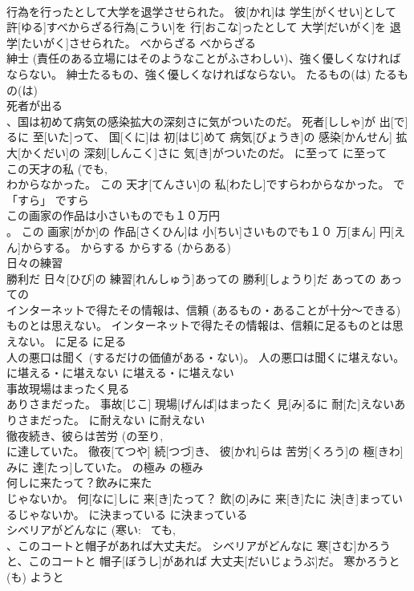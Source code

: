 \documentclass[8pt]{extreport}
\begin{document}
\begin{CJK}{UTF8}{min}
\\	行為を行ったとして大学を退学させられた。	彼[かれ]は 学生[がくせい]として 許[ゆる]すべからざる行為[こうい]を 行[おこな]ったとして 大学[だいがく]を 退学[たいがく]させられた。	べからざる	べからざる	
\\	紳士 (責任のある立場にはそのようなことがふさわしい)、強く優しくなければならない。	紳士たるもの、強く優しくなければならない。	たるもの(は)	たるもの(は)	
\\	死者が出る 
\\	、国は初めて病気の感染拡大の深刻さに気がついたのだ。	死者[ししゃ]が 出[で]るに 至[いた]って、 国[くに]は 初[はじ]めて 病気[びょうき]の 感染[かんせん] 拡大[かくだい]の 深刻[しんこく]さに 気[き]がついたのだ。	に至って	に至って	
\\	この天才の私 (でも, 
\\	わからなかった。	この 天才[てんさい]の 私[わたし]ですらわからなかった。	で「すら」	ですら	
\\	この画家の作品は小さいものでも１０万円 
\\	。	この 画家[がか]の 作品[さくひん]は 小[ちい]さいものでも１０ 万[まん] 円[えん]からする。	からする	からする (からある)	
\\	日々の練習 
\\	勝利だ	日々[ひび]の 練習[れんしゅう]あっての 勝利[しょうり]だ	あっての	あっての	
\\	インターネットで得たその情報は、信頼 (あるもの・あることが十分～できる)ものとは思えない。	インターネットで得たその情報は、信頼に足るものとは思えない。	に足る	に足る	
\\	人の悪口は聞く (するだけの価値がある・ない)。	人の悪口は聞くに堪えない。	に堪える・に堪えない	に堪える・に堪えない	
\\	事故現場はまったく見る 
\\	ありさまだった。	事故[じこ] 現場[げんば]はまったく 見[み]るに 耐[た]えないありさまだった。	に耐えない	に耐えない	
\\	徹夜続き、彼らは苦労 (の至り, 
\\	に達していた。	徹夜[てつや] 続[つづ]き、 彼[かれ]らは 苦労[くろう]の 極[きわ]みに 達[たっ]していた。	の極み	の極み	
\\	何しに来たって？飲みに来た 
\\	じゃないか。	何[なに]しに 来[き]たって？ 飲[の]みに 来[き]たに 決[き]まっているじゃないか。	に決まっている	に決まっている	
\\	シベリアがどんなに (寒い: ~ても, 
\\	、このコートと帽子があれば大丈夫だ。	シベリアがどんなに 寒[さむ]かろうと、このコートと 帽子[ぼうし]があれば 大丈夫[だいじょうぶ]だ。	寒かろうと(も)	ようと	

\end{CJK}
\end{document}
